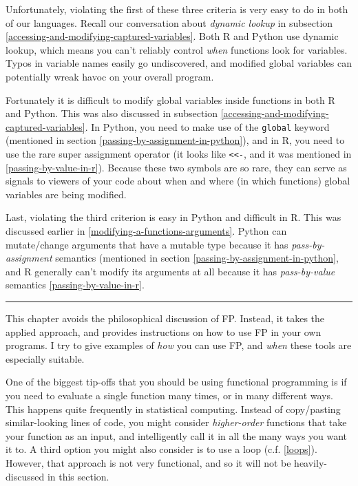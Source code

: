 \documentclass[
  12pt,
]{krantz}
\begin{document}
Unfortunately, violating the first of these three criteria is very easy to do in both of our languages. Recall our conversation about \emph{dynamic lookup} in subsection \ref{accessing-and-modifying-captured-variables}. Both R and Python use dynamic lookup, which means you can't reliably control \emph{when} functions look for variables. Typos in variable names easily go undiscovered, and modified global variables can potentially wreak havoc on your overall program.

Fortunately it is difficult to modify global variables inside functions in both R and Python. This was also discussed in subsection \ref{accessing-and-modifying-captured-variables}. In Python, you need to make use of the \texttt{global} keyword (mentioned in section \ref{passing-by-assignment-in-python}), and in R, you need to use the rare super assignment operator (it looks like \texttt{\textless{}\textless{}-}, and it was mentioned in \ref{passing-by-value-in-r}). Because these two symbols are so rare, they can serve as signals to viewers of your code about when and where (in which functions) global variables are being modified.

Last, violating the third criterion is easy in Python and difficult in R. This was discussed earlier in \ref{modifying-a-functions-arguments}. Python can mutate/change arguments that have a mutable type because it has \emph{pass-by-assignment} semantics (mentioned in section \ref{passing-by-assignment-in-python}, and R generally can't modify its arguments at all because it has \emph{pass-by-value} semantics \ref{passing-by-value-in-r}.

\begin{center}\rule{0.5\linewidth}{0.5pt}\end{center}

This chapter avoids the philosophical discussion of FP. Instead, it takes the applied approach, and provides instructions on how to use FP in your own programs. I try to give examples of \emph{how} you can use FP, and \emph{when} these tools are especially suitable.

One of the biggest tip-offs that you should be using functional programming is if you need to evaluate a single function many times, or in many different ways. This happens quite frequently in statistical computing. Instead of copy/pasting similar-looking lines of code, you might consider \emph{higher-order} functions that take your function as an input, and intelligently call it in all the many ways you want it to. A third option you might also consider is to use a loop (c.f. \ref{loops}). However, that approach is not very functional, and so it will not be heavily-discussed in this section.
\end{document}
